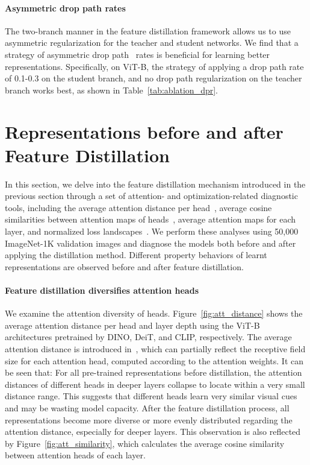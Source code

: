 \documentclass{article}
\begin{document}
\paragraph{Asymmetric drop path rates} The two-branch manner in the feature distillation framework allows us to use asymmetric regularization for the teacher and student networks. We find that a strategy of asymmetric drop path~\cite{huang2016deep} rates is beneficial for learning better representations. Specifically, on ViT-B, the strategy of applying a drop path rate of 0.1-0.3 on the student branch, and no drop path regularization on the teacher branch works best, as shown in Table~\ref{tab:ablation_dpr}.

\section{Representations before and after Feature Distillation}

In this section, we delve into the feature distillation mechanism introduced in the previous section through a set of attention- and optimization-related diagnostic tools, including the average attention distance per head~\cite{dosovitskiy2020vit}, average cosine similarities between attention maps of heads~\citep{zhou2021deepvit}, average attention maps for each layer, and normalized loss landscapes~\cite{losslandscape2017}. We perform these analyses using 50,000 ImageNet-1K validation images and diagnose the models both before and after applying the distillation method. Different property behaviors of learnt representations are observed before and after feature distillation.

\paragraph{Feature distillation diversifies attention heads} We examine the attention diversity of heads. Figure~\ref{fig:att_distance} shows the average attention distance per head and layer depth using the ViT-B architectures pretrained by DINO, DeiT, and CLIP, respectively. The average attention distance is introduced in~\cite{dosovitskiy2020vit}, which can partially reflect the receptive field size for each attention head, computed according to the attention weights. It can be seen that: For all pre-trained representations before distillation, the attention distances of different heads in deeper layers collapse to locate within a very small distance range. This suggests that different heads learn very similar visual cues and may be wasting model capacity. After the feature distillation process, all representations become more diverse or more evenly distributed regarding the attention distance, especially for deeper layers. This observation is also reflected by Figure~\ref{fig:att_similarity}, which calculates the average cosine similarity between attention heads of each layer.
\end{document}
